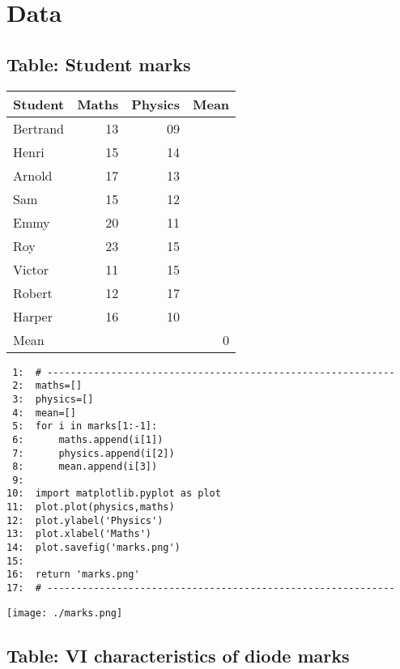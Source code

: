 \documentclass[11pt]{article}
\begin{document}
\section{Data}
\label{sec-2}
\subsection{Table: Student marks}
\label{sec-2-1}



\begin{center}
\begin{tabular}{lrrr}
 Student   &  Maths  &  Physics  &  Mean  \\
\hline
 Bertrand  &     13  &       09  &        \\
 Henri     &     15  &       14  &        \\
 Arnold    &     17  &       13  &        \\
 Sam       &     15  &       12  &        \\
 Emmy      &     20  &       11  &        \\
 Roy       &     23  &       15  &        \\
 Victor    &     11  &       15  &        \\
 Robert    &     12  &       17  &        \\
 Harper    &     16  &       10  &        \\
\hline
 Mean      &         &           &     0  \\
\end{tabular}
\end{center}





\begin{verbatim}
 1:  # ------------------------------------------------------------
 2:  maths=[]
 3:  physics=[]
 4:  mean=[]
 5:  for i in marks[1:-1]:
 6:      maths.append(i[1])
 7:      physics.append(i[2])
 8:      mean.append(i[3])
 9:  
10:  import matplotlib.pyplot as plot
11:  plot.plot(physics,maths)
12:  plot.ylabel('Physics')
13:  plot.xlabel('Maths')
14:  plot.savefig('marks.png')
15:  
16:  return 'marks.png'
17:  # ------------------------------------------------------------
\end{verbatim}


\texttt{[image: ./marks.png]}
\subsection{Table: VI characteristics of diode marks}
\label{sec-2-2}
\end{document}
